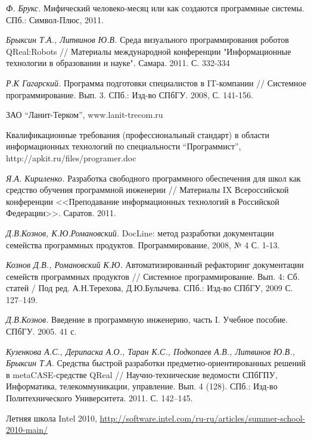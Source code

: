 \documentclass[a5paper]{article}
\begin{document}
\begin{thebibliography}{9001}

   \emph{Ф. Брукс.} 
   Мифический человеко-месяц или как создаются программные системы. 
   СПб.: Символ-Плюс, 2011.
  
   \emph{Брыксин Т.А., Литвинов Ю.В.}
   Среда визуального программирования роботов QReal:Robots // Материалы международной конференции "Информационные технологии в образовании и науке". Самара. 2011. С. 332-334
  
   \emph{Р.К Гагарский.} 
   Программа подготовки специалистов в IT-компании // Системное программирование. Вып. 3. СПб.: Изд-во СПбГУ. 2008, С. 141-156.
  
   ЗАО ``Ланит-Терком'', www.lanit-trecom.ru

   Квалификационные требования (профессиональный стандарт) 
   в области информационных технологий по специальности ``Программист'', 
   http://apkit.ru/files/programer.doc
  
   \emph{Я.А. Кириленко.} 
   Разработка свободного программного обеспечения для школ как средство обучения 
   программной инженерии // Материалы IX Всероссийской конференции <<Преподавание 
   информационных технологий в Российской Федерации>>. Саратов. 2011.
  
   \emph{Д.В.Кознов, К.Ю.Романовский.}  
   DocLine: метод разработки документации семейства программных продуктов. Программирование, 2008, № 4 С. 1-13.

   \emph{Кознов Д.В., Романовский К.Ю.} 
   Автоматизированный рефакторинг документации семейств 
   программных продуктов // Системное программирование. 
   Вып. 4: Сб. статей / Под ред. А.Н.Терехова, Д.Ю.Булычева. 
   СПб.: Изд-во СПбГУ, 2009 С. 127--149.

  
   \emph{Д.В.Кознов.} 
   Введение в программную инженерию, часть I. Учебное пособие. СПбГУ. 
   2005. 41 с. 
  
   \emph{Кузенкова А.С., Дерипаска А.О., Таран К.С., Подкопаев А.В., Литвинов Ю.В., Брыксин Т.А.} 
   Средства быстрой разработки предметно-ориентированных решений в metaCASE-средстве 
   QReal // Научно-технические ведомости СПбГПУ, Информатика, 
   телекоммуникации, управление. Вып. 4 (128). СПб.: Изд-во Политехнического 
   Университета. 2011. С. 142--145.

   Летняя школа Intel 2010, \url{http://software.intel.com/ru-ru/articles/summer-school-2010-main/}
  

\end{thebibliography}
\end{document}

